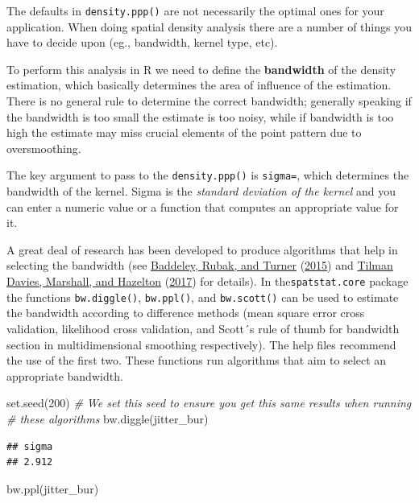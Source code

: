 \documentclass[
  krantz2]{krantz}
\makeatletter
\newenvironment{Shaded}{\begin{snugshade}}{\end{snugshade}}
\newcommand{\CommentTok}[1]{\textcolor[rgb]{0.37,0.37,0.37}{\textit{#1}}}
\newcommand{\DecValTok}[1]{\textcolor[rgb]{0.06,0.06,0.06}{#1}}
\newcommand{\FunctionTok}[1]{\textcolor[rgb]{0,0,0}{#1}}
\newcommand{\NormalTok}[1]{#1}
\newenvironment{kframe}{%
\medskip{}
\setlength{\fboxsep}{.8em}
 \def\at@end@of@kframe{}%
 \ifinner\ifhmode%
  \def\at@end@of@kframe{\end{minipage}}%
  \begin{minipage}{\columnwidth}%
 \fi\fi%
 \def\FrameCommand##1{\hskip\@totalleftmargin \hskip-\fboxsep
 \colorbox{shadecolor}{##1}\hskip-\fboxsep
     \hskip-\linewidth \hskip-\@totalleftmargin \hskip\columnwidth}%
 \MakeFramed {\advance\hsize-\width
   \@totalleftmargin\z@ \linewidth\hsize
   \@setminipage}}%
 {\par\unskip\endMakeFramed%
 \at@end@of@kframe}
\renewenvironment{Shaded}{\begin{kframe}}{\end{kframe}}
\makeatother
\begin{document}
The defaults in \texttt{density.ppp()} are not necessarily the optimal ones for your application. When doing spatial density analysis there are a number of things you have to decide upon (eg., bandwidth, kernel type, etc).

To perform this analysis in R we need to define the \textbf{bandwidth} of the density estimation, which basically determines the area of influence of the estimation. There is no general rule to determine the correct bandwidth; generally speaking if the bandwidth is too small the estimate is too noisy, while if bandwidth is too high the estimate may miss crucial elements of the point pattern due to oversmoothing.

The key argument to pass to the \texttt{density.ppp()} is \texttt{sigma=}, which determines the bandwidth of the kernel. Sigma is the \emph{standard deviation of the kernel} and you can enter a numeric value or a function that computes an appropriate value for it.

A great deal of research has been developed to produce algorithms that help in selecting the bandwidth (see \protect\hyperlink{ref-Baddeley_2016}{Baddeley, Rubak, and Turner} (\protect\hyperlink{ref-Baddeley_2016}{2015}) and \protect\hyperlink{ref-Davies_2017}{Tilman Davies, Marshall, and Hazelton} (\protect\hyperlink{ref-Davies_2017}{2017}) for details). In the\texttt{spatstat.core} package the functions \texttt{bw.diggle()}, \texttt{bw.ppl()}, and \texttt{bw.scott()} can be used to estimate the bandwidth according to difference methods (mean square error cross validation, likelihood cross validation, and Scott´s rule of thumb for bandwidth section in multidimensional smoothing respectively). The help files recommend the use of the first two. These functions run algorithms that aim to select an appropriate bandwidth.

\begin{Shaded}
\begin{Highlighting}[]
\FunctionTok{set.seed}\NormalTok{(}\DecValTok{200}\NormalTok{) }\CommentTok{\# We set this seed to ensure you get this same results when running}
              \CommentTok{\# these algorithms}
\FunctionTok{bw.diggle}\NormalTok{(jitter\_bur)}
\end{Highlighting}
\end{Shaded}

\begin{verbatim}
## sigma 
## 2.912
\end{verbatim}

\begin{Shaded}
\begin{Highlighting}[]
\FunctionTok{bw.ppl}\NormalTok{(jitter\_bur)}
\end{Highlighting}
\end{Shaded}
\end{document}
